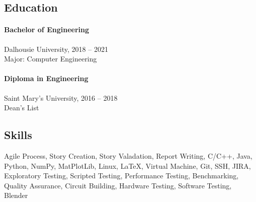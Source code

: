 \documentclass[10pt, twocolumn]{article}
\begin{document}

\subsection*{Education}
\paragraph{Bachelor of Engineering} Dalhousie University, 2018 -- 2021\\
Major: Computer Engineering

\paragraph{Diploma in Engineering} Saint Mary's University, 2016 -- 2018\\
Dean's List


\subsection*{Skills}
Agile Process,
Story Creation,
Story Valadation,
Report Writing,
C/C++,
Java,
Python,
NumPy,
MatPlotLib,
Linux,
\LaTeX,
Virtual Machine,
Git,
SSH,
JIRA,
Exploratory Testing,
Scripted Testing,
Performance Testing,
Benchmarking,
Quality Assurance,
Circuit Building,
Hardware Testing,
Software Testing,
Blender
\end{document}
